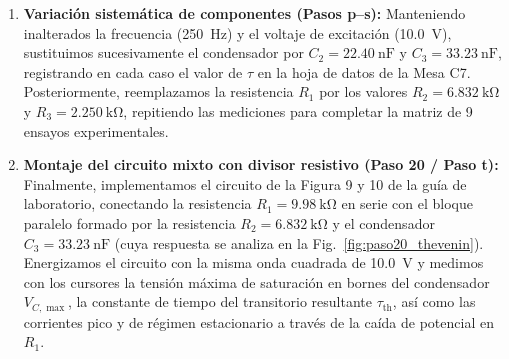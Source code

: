 \begin{enumerate}
    \item \textbf{Variación sistemática de componentes (Pasos p--s):} Manteniendo inalterados la frecuencia (\qty{250}{\hertz}) y el voltaje de excitación (\qty{10,0}{\volt}), sustituimos sucesivamente el condensador por $C_2 = \qty{22,40}{\nano\farad}$ y $C_3 = \qty{33,23}{\nano\farad}$, registrando en cada caso el valor de $\tau$ en la hoja de datos de la Mesa C7. Posteriormente, reemplazamos la resistencia $R_1$ por los valores $R_2 = \qty{6,832}{\kilo\ohm}$ y $R_3 = \qty{2,250}{\kilo\ohm}$, repitiendo las mediciones para completar la matriz de 9 ensayos experimentales.
    
    \item \textbf{Montaje del circuito mixto con divisor resistivo (Paso 20 / Paso t):} Finalmente, implementamos el circuito de la Figura 9 y 10 de la guía de laboratorio, conectando la resistencia $R_1 = \qty{9,98}{\kilo\ohm}$ en serie con el bloque paralelo formado por la resistencia $R_2 = \qty{6,832}{\kilo\ohm}$ y el condensador $C_3 = \qty{33,23}{\nano\farad}$ (cuya respuesta se analiza en la Fig.~\ref{fig:paso20_thevenin}). Energizamos el circuito con la misma onda cuadrada de \qty{10,0}{\volt} y medimos con los cursores la tensión máxima de saturación en bornes del condensador $V_{C,\max}$, la constante de tiempo del transitorio resultante $\tau_{\text{th}}$, así como las corrientes pico y de régimen estacionario a través de la caída de potencial en $R_1$.
\end{enumerate}